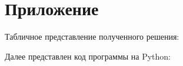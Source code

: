 \documentclass[a4paper,fontsize=14pt]{article}
\begin{document}
	\newpage
	
	\section{Приложение}
	
	Табличное представление полученного решения:
	
	\begin{figure}[h]
		\label{pic3}
		\caption{}
	\end{figure}
	
	Далее представлен код программы на Python: \\
	
	
	
\end{document}
